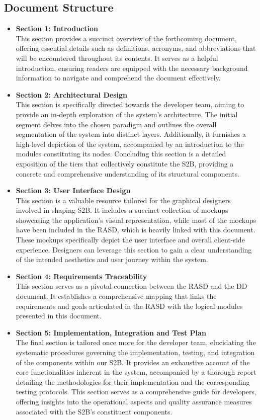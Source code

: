 \documentclass[12pt,oneside,a4paper]{article}
\begin{document}
\subsection{Document Structure}
\begin{itemize}
    \item \textbf{Section 1: Introduction}\\ This section provides a succinct overview of the forthcoming document, offering essential details such as definitions, acronyms, and abbreviations that will be encountered throughout its contents. It serves as a helpful introduction, ensuring readers are equipped with the necessary background information to navigate and comprehend the document effectively.
    \item \textbf{Section 2: Architectural Design}\\ This section is specifically directed towards the developer team, aiming to provide an in-depth exploration of the system's architecture. The initial segment delves into the chosen paradigm and outlines the overall segmentation of the system into distinct layers. Additionally, it furnishes a high-level depiction of the system, accompanied by an introduction to the modules constituting its nodes. Concluding this section is a detailed exposition of the tiers that collectively constitute the S2B, providing a concrete and comprehensive understanding of its structural components.
    \item \textbf{Section 3: User Interface Design}\\ This section is a valuable resource tailored for the graphical designers involved in shaping S2B. It includes a succinct collection of mockups showcasing the application's visual representation, while most of the mockups have been included in the RASD, which is heavily linked with this document. These mockups specifically depict the user interface and overall client-side experience. Designers can leverage this section to gain a clear understanding of the intended aesthetics and user journey within the system.
    \item \textbf{Section 4: Requirements Traceability}\\ This section serves as a pivotal connection between the RASD and the DD document. It establishes a comprehensive mapping that links the requirements and goals articulated in the RASD with the logical modules presented in this document.
    \item \textbf{Section 5: Implementation, Integration and Test Plan}\\ The final section is tailored once more for the developer team, elucidating the systematic procedures governing the implementation, testing, and integration of the components within our S2B. It provides an exhaustive account of the core functionalities inherent in the system, accompanied by a thorough report detailing the methodologies for their implementation and the corresponding testing protocols. This section serves as a comprehensive guide for developers, offering insights into the operational aspects and quality assurance measures associated with the S2B's constituent components.
\end{itemize}
\end{document}
